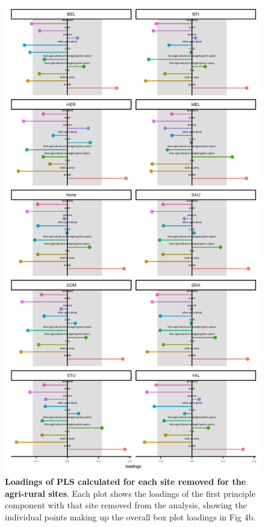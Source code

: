 \documentclass[12pt,letter]{amsart}
\begin{document}
\begin{figure}[h]
	\centering
	\includegraphics{../results/figures/SI_figures/agrirural_jk_individual_loadings.png}
	\caption{\textbf{Loadings of PLS calculated for each site removed for the agri-rural sites}. Each plot shows the loadings of the first principle component with that site removed from the analysis, showing the individual points making up the overall box plot loadings in Fig 4b.}
\end{figure}
\end{document}
